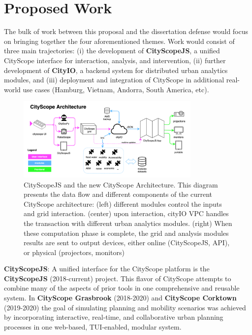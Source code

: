 \section{Proposed Work}

{The bulk of work between this proposal and the dissertation defense would focus on bringing together the four aforementioned themes. Work would consist of three main trajectories: (i) the development of \textbf{CityScopeJS}, a unified CityScope interface for interaction, analysis, and intervention, (ii) further development of \textbf{CityIO}, a backend system for distributed urban analytics modules, and (iii) deployment and integration of CityScope in additional real-world use cases (Hamburg, Vietnam, Andorra, South America, etc).}

\begin{figure}[t]
\begin{center}
    \includegraphics[width=0.8\textwidth]{figures/csjs_arch.png}
\end{center}
   \caption{CityScopeJS and the new CityScope Architecture. This diagram presents the data flow and different components of the current CityScope architecture: (left) different modules control the inputs and grid interaction. (center) upon interaction, cityIO VPC handles the transaction with different urban analytics modules. (right) When these computation phase is complete, the grid and analysis modules results are sent to output devices, either online (CityScopeJS, API), or physical (projectors, monitors)}
\label{fig:csjs_arch}
\end{figure}


{\textbf{CityScopeJS}: A unified interface for the CityScope platform is the \textbf{CityScopeJS} (2018-current) project. This flavor of CityScope attempts to combine many of the aspects of prior tools in one comprehensive and reusable system. In \textbf{CityScope Grasbrook} (2018-2020) and \textbf{CityScope Corktown} (2019-2020) the goal of simulating planning and mobility scenarios was achieved by incorporating interactive, real-time, and collaborative urban planning processes in one web-based, TUI-enabled, modular system.}

